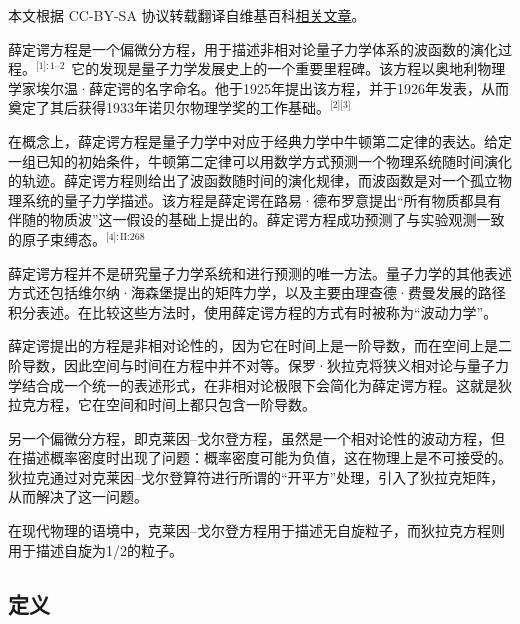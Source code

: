 
本文根据 CC-BY-SA 协议转载翻译自维基百科\href{https://en.wikipedia.org/wiki/Schr\%C3\%B6dinger_equation}{相关文章}。

薛定谔方程是一个偏微分方程，用于描述非相对论量子力学体系的波函数的演化过程。\(^\text{[1]: 1–2 }\) 它的发现是量子力学发展史上的一个重要里程碑。该方程以奥地利物理学家埃尔温·薛定谔的名字命名。他于1925年提出该方程，并于1926年发表，从而奠定了其后获得1933年诺贝尔物理学奖的工作基础。\(^\text{[2][3]}\)

在概念上，薛定谔方程是量子力学中对应于经典力学中牛顿第二定律的表达。给定一组已知的初始条件，牛顿第二定律可以用数学方式预测一个物理系统随时间演化的轨迹。薛定谔方程则给出了波函数随时间的演化规律，而波函数是对一个孤立物理系统的量子力学描述。该方程是薛定谔在路易·德布罗意提出“所有物质都具有伴随的物质波”这一假设的基础上提出的。薛定谔方程成功预测了与实验观测一致的原子束缚态。\(^\text{[4]: II:268 }\)

薛定谔方程并不是研究量子力学系统和进行预测的唯一方法。量子力学的其他表述方式还包括维尔纳·海森堡提出的矩阵力学，以及主要由理查德·费曼发展的路径积分表述。在比较这些方法时，使用薛定谔方程的方式有时被称为“波动力学”。

薛定谔提出的方程是非相对论性的，因为它在时间上是一阶导数，而在空间上是二阶导数，因此空间与时间在方程中并不对等。保罗·狄拉克将狭义相对论与量子力学结合成一个统一的表述形式，在非相对论极限下会简化为薛定谔方程。这就是狄拉克方程，它在空间和时间上都只包含一阶导数。

另一个偏微分方程，即克莱因–戈尔登方程，虽然是一个相对论性的波动方程，但在描述概率密度时出现了问题：概率密度可能为负值，这在物理上是不可接受的。狄拉克通过对克莱因–戈尔登算符进行所谓的“开平方”处理，引入了狄拉克矩阵，从而解决了这一问题。

在现代物理的语境中，克莱因–戈尔登方程用于描述无自旋粒子，而狄拉克方程则用于描述自旋为1/2的粒子。
\subsection{定义}

